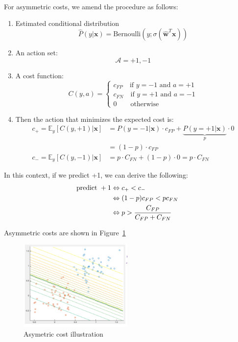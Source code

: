 \documentclass[a4paper,10pt,twoside]{article}
\begin{document}
For asymmetric costs, we amend the procedure as follows:
\begin{enumerate}
\item Estimated conditional distribution
  \begin{equation*}
    \hat{P}(y|\mathbf{x})=\mathrm{Bernoulli}(y;\sigma(\hat{\mathbf{w}}^T\mathbf{x}))
  \end{equation*}
\item An action set:
  \begin{equation*}
    \mathcal{A} = {+1,-1}
  \end{equation*}
\item A cost function:
  \begin{equation*}
    C(y,a)=
    \begin{cases}
      c_{FP}\quad\text{if }y=-1\text{ and }a=+1\\
      c_{FN}\quad\text{if }y=+1\text{ and }a=-1\\
      0\qquad\text{otherwise}
    \end{cases}
  \end{equation*}
\item Then the action that minimizes the expected cost is:
  \begin{align*}
    c_+ = \mathbb{E}_y[C(y,+1)|\mathbf{x}] &= P(y=-1|\mathbf{x})\cdot c_{FP}+\underbrace{P(y=+1|\mathbf{x})}_{p}\cdot 0\\
                                           &=(1-p)\cdot c_{FP}\\
    c_- = \mathbb{E}_y[C(y,-1)|\mathbf{x}] &= p\cdot C_{FN}+(1-p)\cdot 0 = p\cdot C_{FN}
  \end{align*}
\end{enumerate}
In this context, if we predict +1, we can derive the following:
\begin{align*}
  \text{predict }+1 &\Leftrightarrow c_+ < c_-\\
                    &\Leftrightarrow (1-p) c_{FP}<p c_{FN}\\
                    &\Leftrightarrow p>{C_{FP}\over C_{FP}+C_{FN}}
\end{align*}

Asymmetric costs are shown in Figure~\ref{fig:asymmetric_costs}

\begin{figure}
  \centering
  \includegraphics[width=0.5\textwidth]{figures/asymmetric_cost.png}
  \caption{Asymetric cost illustration}
  \label{fig:asymmetric_costs}
\end{figure}
\end{document}
